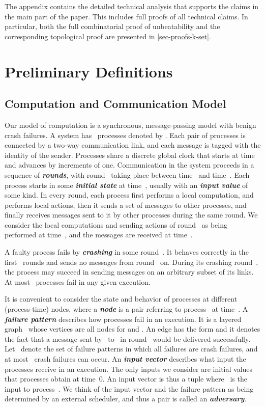 \documentclass[11pt]{article}
\theoremstyle{definition}
\newcommand{\defemph}[1]{\textbf{\textit{#1}}}
\begin{document}
The appendix
contains the detailed technical analysis that supports the claims in the main part of the paper. This includes
full proofs of all technical claims. In particular, both the full combinatorial proof of unbeatability and
the corresponding
topological proof are presented in \cref{sec-proofs-k-set}.

\section{Preliminary Definitions}
\label{sec:model}

\subsection{Computation and Communication Model}
\label{sec:model-communication}

Our model of computation is a synchronous, message-passing model with
benign crash failures.
A system has~\mbox{} processes denoted by
.
Each pair of processes is connected by a two-way communication link,
and each message is tagged with the identity of the sender.
Processes
share a discrete global clock that starts
at time~ and
advances by increments of one. Communication in the system proceeds in
a sequence of \defemph{rounds}, with round~ taking place between
time~ and time~.
Each process starts in some \defemph{initial state} at time~,
usually with an \defemph{input value} of some kind.
In every round, each process first performs a local computation, and performs local actions,
then
it sends a set of messages to other processes, and finally receives messages sent to it
by other processes during the same round.
We consider the
local computations and sending actions of round~ as being performed at time~,
and the messages are received at time~.

A faulty process fails by \defemph{crashing} in some round~.
It behaves correctly in the first~ rounds and
sends no messages from round~ on.
During its crashing round~, the process may succeed in
sending messages on an arbitrary subset of its links.
At most~ processes fail in any given execution.

It is convenient to consider the state and behavior of processes at different (process-time) nodes, where a \defemph{node}  is a pair  referring to process~ at time~.
A \defemph{failure pattern} describes how processes fail in an execution.
It is a layered graph~ whose vertices are
all nodes
 for  and .
An edge has the form 
and it denotes the fact that a message sent by~ to~ in round~ would be delivered successfully.
Let~ denote the set of failure patterns in which
all failures are crash failures, and
at most~ crash failures can occur.
An \defemph{input vector} describes what input the processes receive in an
execution. The only inputs we consider are initial values that processes obtain at time~0.
An input vector is thus a tuple  where~ is the input to process~.
We think of the input vector and the failure pattern as being determined by an external scheduler, and thus a  pair  is called an
\defemph{adversary}.
\end{document}
